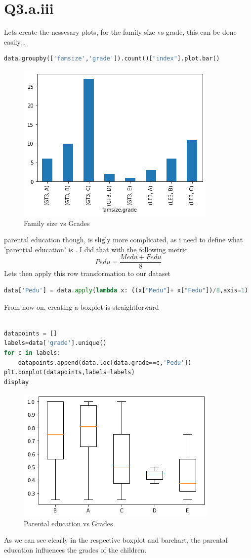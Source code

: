 \documentclass[openany]{article}
\begin{document}
	\section{Q3.a.iii}
		Lets create the nessesary plots, for the family size vs grade, this can be done easily...
		\begin{lstlisting}[language=Python]
data.groupby(['famsize','grade']).count()["index"].plot.bar()
		\end{lstlisting}	
		\begin{figure}[H]
			\iftrue
			\centering
			\caption{Family size vs Grades}
			\includegraphics[scale=0.5]{q3-a-ii-1}
			\fi
		\end{figure}
		parental education though, is sligly more complicated, as i need to define what 'parential education' is . I did that with the following metric
		\begin{equation}
			Pedu=\frac{Medu+Fedu}{8}
		\end{equation}
		Lets then apply this row transformation to our dataset
		\begin{lstlisting}[language=Python]
data['Pedu'] = data.apply(lambda x: ((x["Medu"]+ x["Fedu"])/8,axis=1)
		\end{lstlisting}	
		From now on, creating a boxplot is straightforward
		\begin{lstlisting}[language=Python]

datapoints = []
labels=data['grade'].unique()
for c in labels:
	datapoints.append(data.loc[data.grade==c,'Pedu'])
plt.boxplot(datapoints,labels=labels)
display
		\end{lstlisting}
		\begin{figure}[H]
			\iftrue
			\centering
			\caption{Parental education vs Grades}
			\includegraphics[scale=0.5]{q3-a-ii-2}
			\fi
		\end{figure}
		As we can see clearly in the respective boxplot and barchart, the parental education influences the grades of the children.
\end{document}
